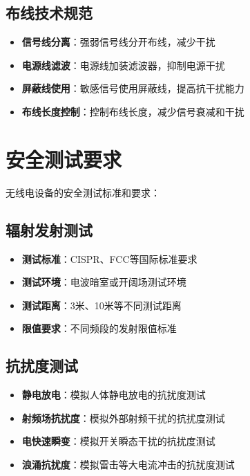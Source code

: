 \documentclass[12pt,UTF8]{ctexbook}
\begin{document}
\subsection{布线技术规范}

\begin{itemize}[leftmargin=3.5em]
    \item \textbf{信号线分离}：强弱信号线分开布线，减少干扰
    \item \textbf{电源线滤波}：电源线加装滤波器，抑制电源干扰
    \item \textbf{屏蔽线使用}：敏感信号使用屏蔽线，提高抗干扰能力
    \item \textbf{布线长度控制}：控制布线长度，减少信号衰减和干扰
\end{itemize}

\section{安全测试要求}

无线电设备的安全测试标准和要求：

\subsection{辐射发射测试}

\begin{itemize}[leftmargin=3.5em]
    \item \textbf{测试标准}：CISPR、FCC等国际标准要求
    \item \textbf{测试环境}：电波暗室或开阔场测试环境
    \item \textbf{测试距离}：3米、10米等不同测试距离
    \item \textbf{限值要求}：不同频段的发射限值标准
\end{itemize}

\subsection{抗扰度测试}

\begin{itemize}[leftmargin=3.5em]
    \item \textbf{静电放电}：模拟人体静电放电的抗扰度测试
    \item \textbf{射频场抗扰度}：模拟外部射频干扰的抗扰度测试
    \item \textbf{电快速瞬变}：模拟开关瞬态干扰的抗扰度测试
    \item \textbf{浪涌抗扰度}：模拟雷击等大电流冲击的抗扰度测试
\end{itemize}
\end{document}
